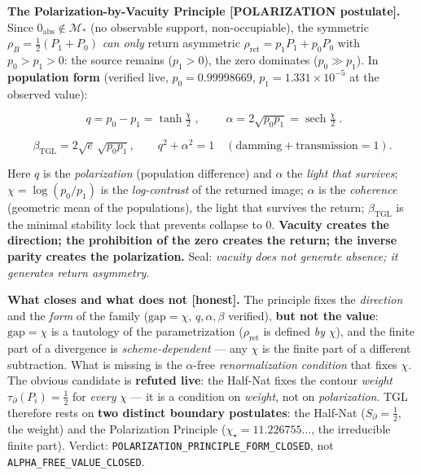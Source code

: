 \documentclass[11pt]{article}
\theoremstyle{definition}\newtheorem{deriv}{Derivation}
\begin{document}
\textbf{The Polarization-by-Vacuity Principle \textsf{[POLARIZATION postulate]}.} Since $0_{\mathrm{abs}}\notin\mathcal M_*$ (no observable support, non-occupiable), the symmetric $\rho_B=\tfrac12(P_1+P_0)$ \emph{can only} return asymmetric $\rho_{\mathrm{ret}}=p_1P_1+p_0P_0$ with $p_0>p_1>0$: the source remains ($p_1>0$), the zero dominates ($p_0\gg p_1$). In \textbf{population form} (verified live, $p_0=0.99998669$, $p_1=1.331\times10^{-5}$ at the observed value):

\begin{equation}\boxed{\;q=p_0-p_1=\tanh\tfrac\chi2\;},\qquad \boxed{\;\alpha=2\sqrt{p_0p_1}=\operatorname{sech}\tfrac\chi2\;}.\end{equation}

\begin{equation}\beta_{\mathrm{TGL}}=2\sqrt e\,\sqrt{p_0p_1},\qquad q^2+\alpha^2=1\quad(\text{damming}+\text{transmission}=1).\end{equation}

Here $q$ is the \emph{polarization} (population difference) and $\alpha$ the \emph{light that survives}; $\chi=\log(p_0/p_1)$ is the \emph{log-contrast} of the returned image; $\alpha$ is the \emph{coherence} (geometric mean of the populations), the light that survives the return; $\beta_{\mathrm{TGL}}$ is the minimal stability lock that prevents collapse to $0$. \textbf{Vacuity creates the direction; the prohibition of the zero creates the return; the inverse parity creates the polarization.} Seal: \emph{vacuity does not generate absence; it generates return asymmetry.}

\textbf{What closes and what does not \textsf{[honest]}.} The principle fixes the \emph{direction} and the \emph{form} of the family ($\mathrm{gap}=\chi$, $q,\alpha,\beta$ verified), \textbf{but not the value}: $\mathrm{gap}=\chi$ is a tautology of the parametrization ($\rho_{\mathrm{ret}}$ is defined \emph{by} $\chi$), and the finite part of a divergence is \emph{scheme-dependent} --- any $\chi$ is the finite part of a different subtraction. What is missing is the $\alpha$-free \emph{renormalization condition} that fixes $\chi$. The obvious candidate is \textbf{refuted live}: the Half-Nat fixes the contour \emph{weight} $\tau_\partial(P_i)=\tfrac12$ for \emph{every} $\chi$ --- it is a condition on \emph{weight}, not on \emph{polarization}. TGL therefore rests on \textbf{two distinct boundary postulates}: the Half-Nat ($S_\partial=\tfrac12$, the weight) and the Polarization Principle ($\chi_\star=11.226755\ldots$, the irreducible finite part). Verdict: \texttt{POLARIZATION\_PRINCIPLE\_FORM\_CLOSED}, not \texttt{ALPHA\_FREE\_VALUE\_CLOSED}.
\end{document}
